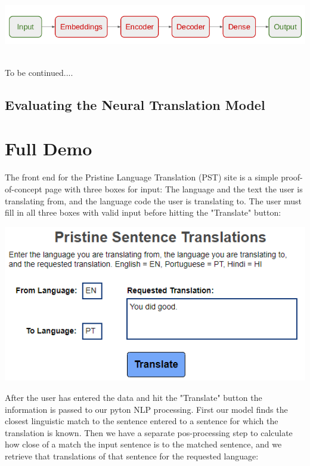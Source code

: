 \documentclass[runningheads]{llncs}
\begin{document}
	\begin{minipage}{\linewidth}
		\begin{center}
			\includegraphics[width=\linewidth]{architecture.png}
			\label{fig:Model Architectture}~\cite{ref_url7}
		\end{center}
	\end{minipage}
	\afterpage{\clearpage}


	To be continued....
	
	
	\subsection{Evaluating the Neural Translation Model}
	
	\section{Full Demo}
	The front end for the Pristine Language Translation (PST) site is a simple proof-of-concept page with three boxes for input: The language and the text the user is translating from, and the language code the user is translating to. The user must fill in all three boxes with valid input before hitting the "Translate" button:

	\begin{minipage}{\linewidth}
		\begin{center}
			\includegraphics[width=\linewidth]{Screen_top.png}
			\label{fig:Language Input}
			\vspace*{1cm}
		\end{center}
	\end{minipage}
	\afterpage{\clearpage}
After the user has entered the data and hit the "Translate" button the information is passed to our pyton NLP processing. First our model finds the closest linguistic match to the sentence entered to a sentence for which the translation is known. Then we have a separate pos-processing step to calculate how close of a match the input sentence is to the matched sentence, and we retrieve that translations of that sentence for the requested language:
\end{document}
